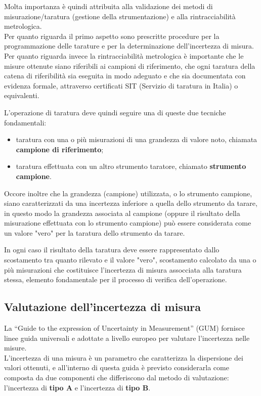 \documentclass[a4paper, twoside]{article}
\begin{document}
Molta importanza è quindi attribuita alla validazione dei metodi di misurazione/taratura (gestione della strumentazione) e alla rintracciabilità metrologica.\\
Per quanto riguarda il primo aspetto sono prescritte procedure per la programmazione delle tarature e per la determinazione dell'incertezza di misura.\\
Per quanto riguarda invece la rintracciabilità metrologica è importante che le misure ottenute siano riferibili ai campioni di riferimento, che ogni taratura della catena di riferibilità sia eseguita in modo adeguato e che sia documentata con evidenza formale, attraverso certificati SIT (Servizio di taratura in Italia) o equivalenti.\par

L'operazione di taratura deve quindi seguire una di queste due tecniche fondamentali:

\begin{itemize}
    \item taratura con una o più misurazioni di una grandezza di valore noto, chiamata \textbf{campione di riferimento};
    \item taratura effettuata con un altro strumento taratore, chiamato \textbf{strumento campione}.
\end{itemize}

\noindent
Occore inoltre che la grandezza (campione) utilizzata, o lo strumento campione, siano caratterizzati da una incertezza inferiore a quella dello strumento da tarare, in questo modo la grandezza associata al campione (oppure il risultato della misurazione effettuata con lo strumento campione) può essere considerata come un valore "vero" per la taratura dello strumento da tarare. \par

In ogni caso il risultato della taratura deve essere rappresentato dallo scostamento tra quanto rilevato e il valore "vero", scostamento calcolato da una o più misurazioni che costituisce l'incertezza di misura assocciata alla taratura stessa, elemento fondamentale per il processo di verifica dell'operazione.\par


\subsection{Valutazione dell'incertezza di misura}

La “Guide to the expression of Uncertainty in Measurement” (GUM) fornisce
linee guida universali e adottate a livello europeo per valutare l'incertezza nelle misure.\\
L'incertezza di una misura è un parametro che caratterizza la dispersione dei valori ottenuti, e all'interno di questa guida è previsto considerarla come composta da due componenti che differiscono dal metodo di valutazione: l'incertezza di \textbf{tipo A} e l'incertezza di \textbf{tipo B}.\par
\end{document}
